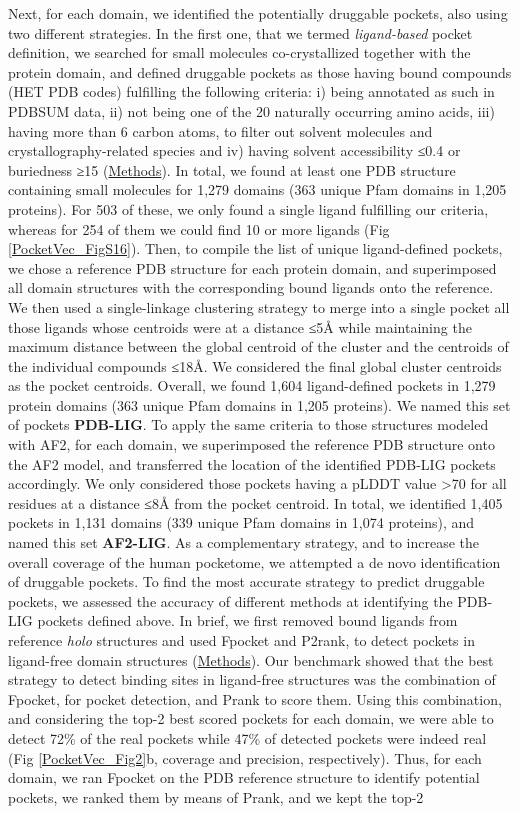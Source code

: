 Next, for each domain, we identified the potentially druggable pockets, also using two different strategies. In the first one, that we termed \textit{ligand-based} pocket definition, we searched for small molecules co-crystallized together with the protein domain, and defined druggable pockets as those having bound compounds (HET PDB codes) fulfilling the following criteria: i) being annotated as such in PDBSUM data, ii) not being one of the 20 naturally occurring amino acids, iii) having more than 6 carbon atoms, to filter out solvent molecules and crystallography-related species and iv) having solvent accessibility ≤0.4 or buriedness ≥15 (\hyperref[PocketVec_Methods]{Methods}). In total, we found at least one PDB structure containing small molecules for 1,279 domains (363 unique Pfam domains in 1,205 proteins). For 503 of these, we only found a single ligand fulfilling our criteria, whereas for 254 of them we could find 10 or more ligands (Fig \ref{PocketVec_FigS16}). Then, to compile the list of unique ligand-defined pockets, we chose a reference PDB structure for each protein domain, and superimposed all domain structures with the corresponding bound ligands onto the reference. We then used a single-linkage clustering strategy to merge into a single pocket all those ligands whose centroids were at a distance ≤5Å while maintaining the maximum distance between the global centroid of the cluster and the centroids of the individual compounds ≤18Å. We considered the final global cluster centroids as the pocket centroids. Overall, we found 1,604 ligand-defined pockets in 1,279 protein domains (363 unique Pfam domains in 1,205 proteins). We named this set of pockets \textbf{PDB-LIG}. To apply the same criteria to those structures modeled with AF2, for each domain, we superimposed the reference PDB structure onto the AF2 model, and transferred the location of the identified PDB-LIG pockets accordingly. We only considered those pockets having a pLDDT value >70 for all residues at a distance ≤8Å from the pocket centroid. In total, we identified 1,405 pockets in 1,131 domains (339 unique Pfam domains in 1,074 proteins), and named this set \textbf{AF2-LIG}. As a complementary strategy, and to increase the overall coverage of the human pocketome, we attempted a de novo identification of druggable pockets. To find the most accurate strategy to predict druggable pockets, we assessed the accuracy of different methods at identifying the PDB-LIG pockets defined above. In brief, we first removed bound ligands from reference \textit{holo} structures and used Fpocket\cite{le_guilloux_fpocket_2009} and P2rank\cite{krivak_p2rank_2018}, to detect pockets in ligand-free domain structures (\hyperref[PocketVec_Methods]{Methods}). Our benchmark showed that the best strategy to detect binding sites in ligand-free structures was the combination of Fpocket, for pocket detection, and Prank to score them. Using this combination, and considering the top-2 best scored pockets for each domain, we were able to detect 72\% of the real pockets while 47\% of detected pockets were indeed real (Fig \ref{PocketVec_Fig2}b, coverage and precision, respectively). Thus, for each domain, we ran Fpocket on the PDB reference structure to identify potential pockets, we ranked them by means of Prank, and we kept the top-2 